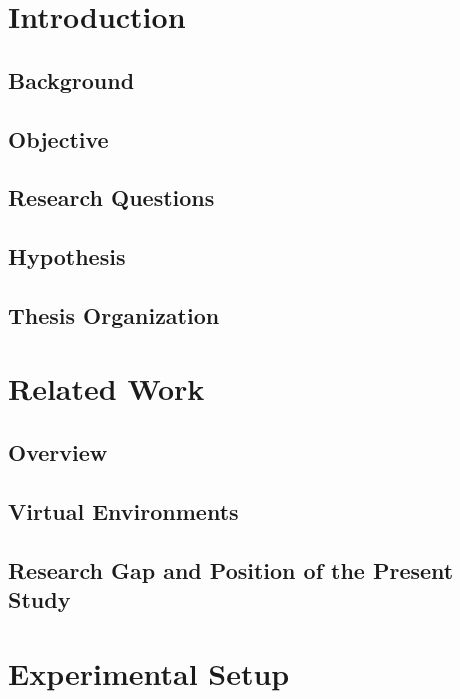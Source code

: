 \chapter{Introduction}

\section{Background}

\section{Objective}

\section{Research Questions}

\section{Hypothesis}

\section{Thesis Organization}

\clearpage

\chapter{Related Work}

\section{Overview}

\section{Virtual Environments}


\section{Research Gap and Position of the Present Study}

\clearpage

\chapter{Experimental Setup}

